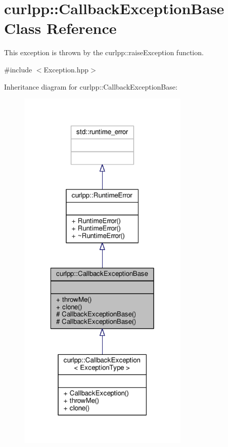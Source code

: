 \hypertarget{classcurlpp_1_1CallbackExceptionBase}{\section{curlpp\-:\-:Callback\-Exception\-Base Class Reference}
\label{classcurlpp_1_1CallbackExceptionBase}
}


This exception is thrown by the curlpp\-::raise\-Exception function.  




{\ttfamily \#include $<$Exception.\-hpp$>$}



Inheritance diagram for curlpp\-:\-:Callback\-Exception\-Base\-:
\nopagebreak
\begin{figure}[H]
\begin{center}
\leavevmode
\includegraphics[width=232pt]{classcurlpp_1_1CallbackExceptionBase__inherit__graph}
\end{center}
\end{figure}


